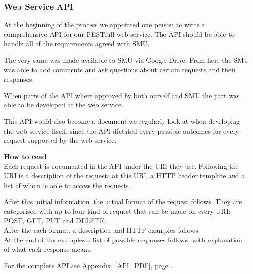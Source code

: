 \subsubsection{Web Service API}
At the beginning of the process we appointed one person to write a comprehensive API for our RESTfull web service.
The API should be able to handle all of the requirements agreed with SMU.

The very same was made available to SMU via Google Drive. From here the SMU was able to add comments and ask questions about certain requests and their responses.

When parts of the API where approved by both ourself and SMU the part was able to be developed at the web service.

This API would also become a document we regularly look at when developing the web service itself, since the API dictated every possible outcomes for every request supported by the web service.

\textbf{How to read}\\
Each request is documented in the API under the URI they use. Following the URI is a description of the requests at this URI, a HTTP header template and a list of whom is able to access the requests.

After this initial information, the actual format of the request follows. They are categorised with up to four kind of request that can be made on every URI: POST, GET, PUT and DELETE. \\
After the each format, a description and HTTP examples follows. \\
At the end of the examples a list of possible responses follows, with explanation of what each response means.

For the complete API see Appendix, \ref{API_PDF}, page \pageref{API_PDF}.